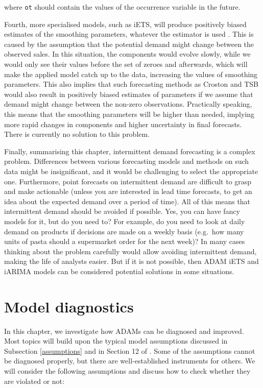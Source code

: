 \documentclass[]{book}
\theoremstyle{definition}
\theoremstyle{definition}
\theoremstyle{definition}
\theoremstyle{definition}
\theoremstyle{remark}
\begin{document}
where \texttt{ot} should contain the values of the occurrence variable in the future.

Fourth, more specialised models, such as iETS, will produce positively biased estimates of the smoothing parameters, whatever the estimator is used \citep[see explanation in][]{Svetunkov2019a}. This is caused by the assumption that the potential demand might change between the observed sales. In this situation, the components would evolve slowly, while we would only see their values before the set of zeroes and afterwards, which will make the applied model catch up to the data, increasing the values of smoothing parameters. This also implies that such forecasting methods as Croston \citep{Croston1972} and TSB \citep{Teunter2011} would also result in positively biased estimates of parameters if we assume that demand might change between the non-zero observations. Practically speaking, this means that the smoothing parameters will be higher than needed, implying more rapid changes in components and higher uncertainty in final forecasts. There is currently no solution to this problem.

Finally, summarising this chapter, intermittent demand forecasting is a complex problem. Differences between various forecasting models and methods on such data might be insignificant, and it would be challenging to select the appropriate one. Furthermore, point forecasts on intermittent demand are difficult to grasp and make actionable (unless you are interested in lead time forecasts, to get an idea about the expected demand over a period of time). All of this means that intermittent demand should be avoided if possible. Yes, you can have fancy models for it, but do you need to? For example, do you need to look at daily demand on products if decisions are made on a weekly basis (e.g.~how many units of pasta should a supermarket order for the next week)? In many cases thinking about the problem carefully would allow avoiding intermittent demand, making the life of analysts easier. But if it is not possible, then ADAM iETS and iARIMA models can be considered potential solutions in some situations.

\hypertarget{diagnostics}{%
\chapter{Model diagnostics}\label{diagnostics}}

In this chapter, we investigate how ADAMs can be diagnosed and improved. Most topics will build upon the typical model assumptions discussed in Subsection \ref{assumptions} and in Section 12 of \citet{SvetunkovSBA}. Some of the assumptions cannot be diagnosed properly, but there are well-established instruments for others. We will consider the following assumptions and discuss how to check whether they are violated or not:
\end{document}
